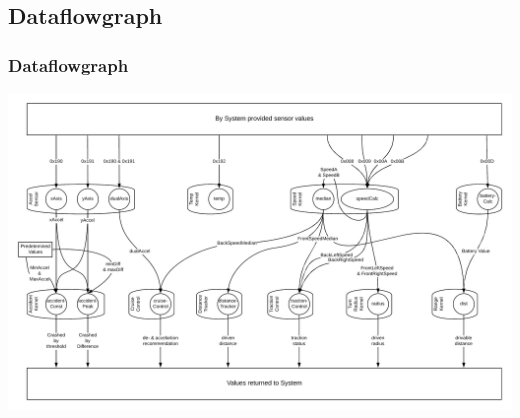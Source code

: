 \documentclass{beamer}
\begin{document}
\subsection{Dataflowgraph}
\begin{frame}
    \frametitle{Dataflowgraph}
    \includegraphics[width=\textwidth]{res/Data_Flow_Kernel.png}
\end{frame}
\end{document}

